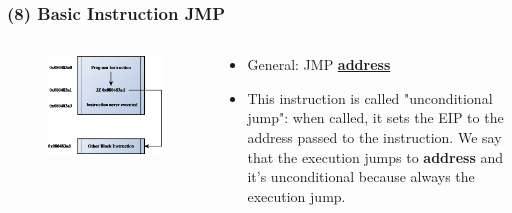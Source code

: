 \documentclass[]{beamer}
\begin{document}
		\begin{frame}
			\frametitle{(8) Basic Instruction JMP}
				\begin{columns}
					\begin{column}[left]{2.5in}
						\begin{figure}
							\includegraphics[width=\textwidth]{images/jmp.eps}
							
							\label{Control Flow JMP}
						\end{figure}
					\end{column}
					\begin{column}[right]{2.5in}
						\begin{itemize}	
							\item{General: JMP \underline{\textbf{address}}}\\

							\item{This instruction is called "unconditional jump": when called, it sets the EIP to the address passed to the instruction. We say that the execution jumps to \textbf{address} and it's unconditional because always the execution jump.}
						\end{itemize}

					\end{column}
				\end{columns}
		\end{frame}
\end{document}
